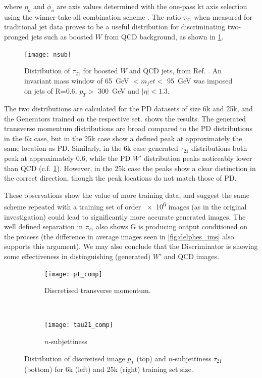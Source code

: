 \documentclass[twocolumn]{article}
\newcommand{\gev}{\giga\electronvolt}
\begin{document}
where $\eta_a$ and $\phi_a$ are axis values determined with the one-pass kt axis selection using the winner-take-all combination scheme \cite{axis}. The ratio $\tau_{21}$ when measured for traditional jet data proves to be a useful distribution for discriminating two-pronged jets such as boosted $W$ from QCD background, as shown in \cref{fig:nsub}.

\begin{figure}[H]
	\centering
	\texttt{[image: nsub]}
	
	\caption{Distribution of $\tau_{21}$ for boosted $W$ and QCD jets, from Ref. \cite{nsubjettiness}. An invariant mass window of \SI{65}{\gev} $< m_jet <$ \SI{95}{\gev} was imposed on jets of R=0.6, $p_T >$ \SI{300}{\gev} and $|\eta| < 1.3$.}
	\label{fig:nsub}
	
\end{figure}

The two distributions are calculated for the PD datasets of size 6k and 25k, and the Generators trained on the respective set.  shows the results. The generated transverse momentum distributions are broad compared to the PD distributions in the 6k case, but in the 25k case show a defined peak at approximately the same location as PD. Similarly, in the 6k case generated $\tau_{21}$ distributions both peak at approximately 0.6, while the PD $W'$ distribution peaks noticeably lower than QCD (c.f. \cref{fig:nsub}). However, in the 25k case the peaks show a clear distinction in the correct direction, though the peak locations do not match those of PD. 

These observations show the value of more training data, and suggest the same scheme repeated with a training set of order \num{e6} images (as in the original investigation) could lead to significantly more accurate generated images. The well defined separation in $\tau_{21}$ also shows G is producing output conditioned on the process (the difference in average images seen in \cref{fig:delphes_ims} also supports this argument). We may also conclude that the Discriminator is showing some effectiveness in distinguishing (generated) $W'$ and QCD images. 

\begin{figure}[!htbp]
	\centering
	\begin{subfigure}[t]{1.0\linewidth}
	\centering
	\texttt{[image: pt\_comp]}

	\caption{Discretised transverse momentum.}
	\label{fig:pt_comp}
	\end{subfigure}%
	\\
	\begin{subfigure}[t]{1.0\linewidth}
		\centering
		\texttt{[image: tau21\_comp]}
		\caption{$n$-subjettiness}
		\label{fig:tau21_comp}
	\end{subfigure}
	\caption{Distribution of discretised image $p_T$ (top) and $n$-subjettiness $\tau_{21}$ (bottom) for 6k (left) and 25k (right) training set size.}
	\label{fig:phys}
\end{figure}
\end{document}
